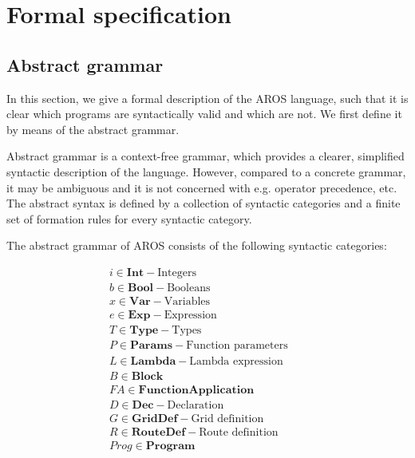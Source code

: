 \section{Formal specification}\label{section:Specification}

\subsection{Abstract grammar}
\label{sec:abstract-grammar}

\par
In this section, we give a formal description of the AROS language, such that it is clear which programs are syntactically valid and which are not. We first define it by means of the abstract grammar. 

\par
Abstract grammar is a context-free grammar, which provides a clearer, simplified syntactic description of the language. However, compared to a concrete grammar, it may be ambiguous and it is not concerned with e.g. operator precedence, etc. The abstract syntax is defined by a collection of syntactic categories and a finite set of formation rules for every syntactic category.

\par
The abstract grammar of AROS consists of the following syntactic categories:


\begin{align*}
    & i \in \mathbf {Int} - \text{Integers} \\
    & b \in \mathbf {Bool} - \text{Booleans} \\
    & x \in \mathbf {Var} - \text{Variables} \\ 
    & e \in \mathbf {Exp} - \text{Expression} \\
    & T \in \mathbf {Type} - \text{Types} \\
    & P \in \mathbf {Params} - \text{Function parameters} \\
    & L \in \mathbf {Lambda} - \text{Lambda expression} \\
    & B \in \mathbf {Block} \\
    & FA \in \mathbf {FunctionApplication} \\
    & D \in \mathbf {Dec} - \text{Declaration} \\
    & G \in \mathbf {GridDef} - \text{Grid definition} \\
    & R \in \mathbf {RouteDef} - \text{Route definition} \\
    & Prog \in \mathbf {Program}
    &&&
\end{align*}

